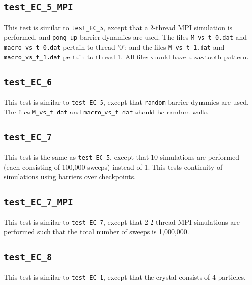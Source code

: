 \documentclass{report}
\begin{document}
\subsection{\texttt{test\_EC\_5\_MPI}}
This test is similar to \texttt{test\_EC\_5}, except that a 2-thread MPI simulation is performed, and \texttt{pong\_up}
barrier dynamics are used. The files \texttt{M\_vs\_t\_0.dat} and \texttt{macro\_vs\_t\_0.dat} pertain to thread '0'; and
the files \texttt{M\_vs\_t\_1.dat} and \texttt{macro\_vs\_t\_1.dat} pertain to thread 1. All files should have a sawtooth
pattern.


\subsection{\texttt{test\_EC\_6}}
This test is similar to \texttt{test\_EC\_5}, except that \texttt{random} barrier dynamics are used. The files 
\texttt{M\_vs\_t.dat} and \texttt{macro\_vs\_t.dat} should be random walks.


\subsection{\texttt{test\_EC\_7}}
This test is the same as \texttt{test\_EC\_5}, except that 10 simulations are performed (each consisting of 100,000
sweeps) instead of 1. This tests continuity of simulations using barriers over checkpoints.


\subsection{\texttt{test\_EC\_7\_MPI}}
This test is similar to \texttt{test\_EC\_7}, except that 2 2-thread MPI simulations are performed such that the total
number of sweeps is 1,000,000.


\subsection{\texttt{test\_EC\_8}}
This test is similar to \texttt{test\_EC\_1}, except that the crystal consists of 4 particles.
\end{document}
